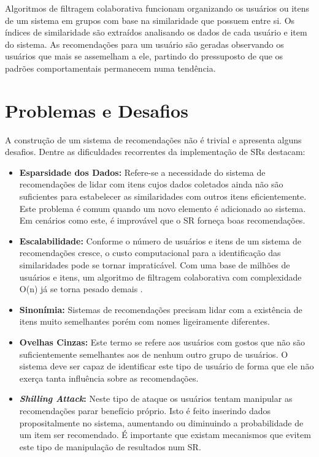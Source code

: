 \documentclass[
	12pt,				%
    oneside,			%
	a4paper,			%
	english,			%
	french,				%
	spanish,			%
	brazil,				%
	]{abntex2}
\begin{document}
Algoritmos de filtragem colaborativa funcionam organizando os usuários ou itens de um sistema em grupos com base na similaridade que possuem entre si.
Os índices de similaridade são extraídos analisando os dados de cada usuário e item do sistema. As recomendações para um usuário são geradas observando
os usuários que mais se assemelham a ele, partindo do pressuposto de que os padrões comportamentais permanecem numa tendência. 
\section{Problemas e Desafios}
A construção de um sistema de recomendações não é trivial e apresenta alguns desafios. Dentre as dificuldades recorrentes da 
implementação de SRs  destacam:

\begin{itemize}
	\item \textbf{Esparsidade dos Dados:} Refere-se a necessidade do sistema de recomendações de lidar com itens cujos dados coletados ainda não são
	suficientes para estabelecer as similaridades com outros itens eficientemente. Este problema é comum quando um novo elemento é adicionado ao sistema. Em cenários
	como este, é improvável que o SR forneça boas recomendações.
	\item \textbf{Escalabilidade:} Conforme o número de usuários e itens de um sistema de recomendações cresce, o custo computacional para a identificação
	das similaridades pode se tornar impraticável. Com uma base de milhões de usuários e itens, um algoritmo de filtragem colaborativa com complexidade O(n)
	já se torna pesado demais \cite{2-CFSurvey}. 
	\item \textbf{Sinonímia:} Sistemas de recomendações precisam lidar com a existência de itens muito semelhantes porém com nomes ligeiramente diferentes.
	\item \textbf{Ovelhas Cinzas:} Este termo se refere aos usuários com gostos que não são suficientemente semelhantes aos de nenhum outro grupo de usuários. O sistema deve
	ser capaz de identificar este tipo de usuário de forma que ele não exerça tanta influência sobre as recomendações.
	\item \textbf{\textit{Shilling Attack}:} Neste tipo de ataque os usuários tentam manipular as recomendações parar benefício
	próprio. Isto é feito inserindo dados propositalmente no sistema, aumentando ou diminuindo a probabilidade de um item ser recomendado. É importante que existam
	mecanismos que evitem este tipo de manipulação de resultados num SR.
\end{itemize}
\end{document}

